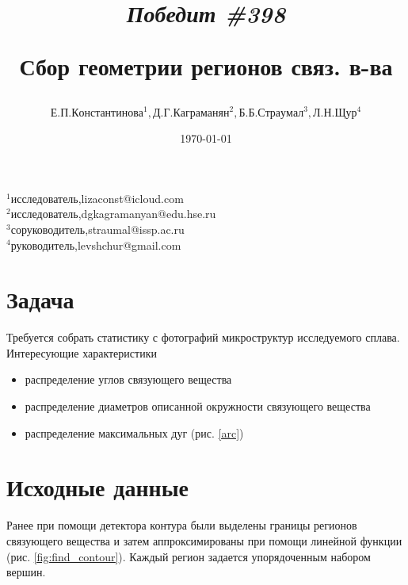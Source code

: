 \documentclass[a4paper, 14pt]{article}
\begin{document}
	\title{		\textbf{\textit{Победит \#398}} 
		
	Сбор геометрии регионов связ. в-ва}

	\author{$Е.П. Константинова^1, Д.Г. Каграманян^2, Б.Б. Страумал^3, Л.Н. Щур^4$}
	\date{\today}
	\maketitle

	\hfill
	\begin{minipage}{1\textwidth}
			\flushleft
		$^1$исследователь,lizaconst@icloud.com \\
	    $^2$исследователь,dgkagramanyan@edu.hse.ru\\
	    $^3$соруководитель,straumal@issp.ac.ru\\
   	 	$^4$руководитель,levshchur@gmail.com\\



	\end{minipage}%


	\section{Задача}
	
	Требуется собрать статистику с фотографий микроструктур исследуемого сплава. 
	Интересующие характеристики
	
	\begin{itemize}
		\item распределение углов связующего вещества
		
		\item распределение диаметров описанной окружности связующего вещества
		
		\item распределение максимальных дуг (рис. \ref{arc})
	\end{itemize}
	
	\section{Исходные данные}
	
	 Ранее при помощи детектора контура \cite{find_contour}  были выделены границы регионов связующего вещества и затем аппроксимированы при помощи линейной функции (рис. \ref{fig:find_contour}). Каждый регион задается упорядоченным набором вершин. 
\end{document}
